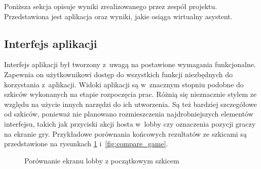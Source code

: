 Poniższa sekcja opisuje wyniki zrealizowanego przez zespół
projektu. Przedstawiona jest aplikacja oraz wyniki, jakie
osiąga wirtualny asystent.

\subsection{Interfejs aplikacji}

Interfejs aplikacji był tworzony z~uwagą na postawione wymagania funkcjonalne.
Zapewnia on użytkownikowi dostęp do wszystkich funkcji niezbędnych do korzystania
z~aplikacji. Widoki aplikacji są w~znacznym stopniu podobne do szkiców wykonanych na etapie
rozpoczęcia prac. Różnią się nieznacznie stylem ze względu na użycie innych narzędzi
do ich utworzenia. Są też bardziej szczegółowe od szkiców, ponieważ nie planowano
rozmieszczenia najdrobniejszych elementów interfejsu, takich jak przyciski akcji hosta
w~lobby czy oznaczenia pozycji graczy na ekranie gry. Przykładowe porównania końcowych
rezultatów ze szkicami są przedstawione na rysunkach \ref{fig:compare_lobby}
i~\ref{fig:compare_game}.

\begin{figure}[h!]
  \centering
  \hspace*{0.5cm}
  \caption{Porównanie ekranu lobby z początkowym szkicem}
  \label{fig:compare_lobby}
\end{figure}

